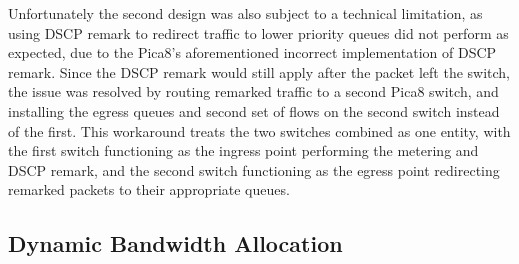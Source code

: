 \documentclass[accepted,single]{gipaper}
\begin{document}
Unfortunately the second design was also subject to a technical limitation, as using DSCP remark to redirect traffic to lower priority queues did not perform as expected, due to the Pica8's aforementioned incorrect implementation of DSCP remark. Since the DSCP remark would still apply after the packet left the switch, the issue was resolved by routing remarked traffic to a second Pica8 switch, and installing the egress queues and second set of flows on the second switch instead of the first. This workaround treats the two switches combined as one entity, with the first switch functioning as the ingress point performing the metering and DSCP remark, and the second switch functioning as the egress point redirecting remarked packets to their appropriate queues.


\subsection{Dynamic Bandwidth Allocation}
\label{min_bandwidth}
\end{document}
